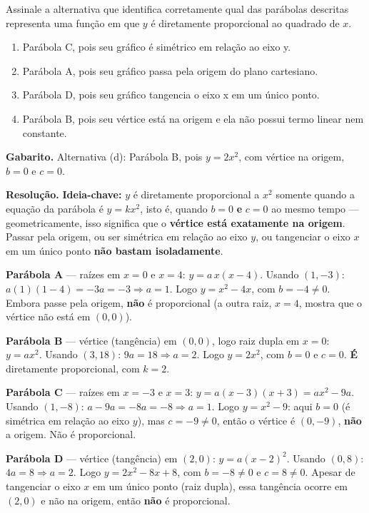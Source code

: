 \documentclass[11pt,a4paper]{article}
\begin{document}
Assinale a alternativa que identifica corretamente qual das parábolas descritas representa uma função em que $y$ é diretamente proporcional ao quadrado de $x$.
\begin{enumerate}[label=(\alph*)]
\item Parábola C, pois seu gráfico é simétrico em relação ao eixo y.
\item Parábola A, pois seu gráfico passa pela origem do plano cartesiano.
\item Parábola D, pois seu gráfico tangencia o eixo x em um único ponto.
\item Parábola B, pois seu vértice está na origem e ela não possui termo linear nem constante.
\end{enumerate}

\textbf{Gabarito.} Alternativa (d): Parábola B, pois $y=2x^2$, com vértice na origem, $b=0$ e $c=0$.

\textbf{Resolução.} \textbf{Ideia-chave:} $y$ é diretamente proporcional a $x^2$ somente quando a equação da parábola é $y=kx^2$, isto é, quando $b=0$ \textbf{e} $c=0$ ao mesmo tempo — geometricamente, isso significa que o \textbf{vértice está exatamente na origem}. Passar pela origem, ou ser simétrica em relação ao eixo $y$, ou tangenciar o eixo $x$ em um único ponto \textbf{não bastam isoladamente}.

\textbf{Parábola A} — raízes em $x=0$ e $x=4$: $y=a\,x(x-4)$. Usando $(1,-3)$: $a(1)(1-4)=-3a=-3 \Rightarrow a=1$. Logo $y=x^2-4x$, com $b=-4\neq 0$. Embora passe pela origem, \textbf{não} é proporcional (a outra raiz, $x=4$, mostra que o vértice não está em $(0,0)$).

\textbf{Parábola B} — vértice (tangência) em $(0,0)$, logo raiz dupla em $x=0$: $y=a x^2$. Usando $(3,18)$: $9a=18 \Rightarrow a=2$. Logo $y=2x^2$, com $b=0$ e $c=0$. \textbf{É} diretamente proporcional, com $k=2$.

\textbf{Parábola C} — raízes em $x=-3$ e $x=3$: $y=a(x-3)(x+3)=ax^2-9a$. Usando $(1,-8)$: $a-9a=-8a=-8 \Rightarrow a=1$. Logo $y=x^2-9$: aqui $b=0$ (é simétrica em relação ao eixo $y$), mas $c=-9\neq 0$, então o vértice é $(0,-9)$, \textbf{não} a origem. Não é proporcional.

\textbf{Parábola D} — vértice (tangência) em $(2,0)$: $y=a(x-2)^2$. Usando $(0,8)$: $4a=8 \Rightarrow a=2$. Logo $y=2x^2-8x+8$, com $b=-8\neq0$ e $c=8\neq0$. Apesar de tangenciar o eixo $x$ em um único ponto (raiz dupla), essa tangência ocorre em $(2,0)$ e não na origem, então \textbf{não} é proporcional.
\end{document}
